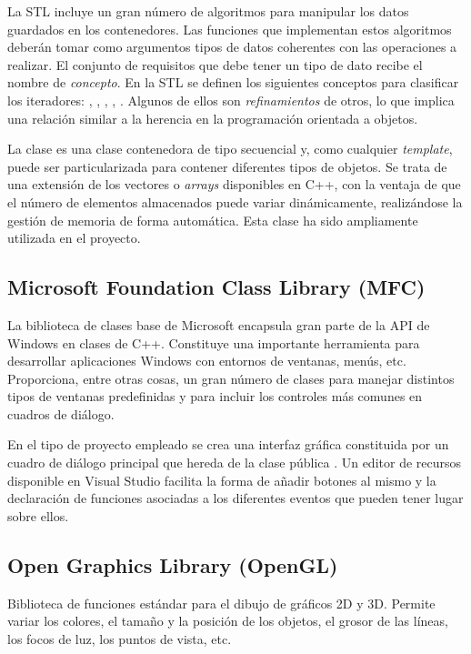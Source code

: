 La STL incluye un gran número de algoritmos para manipular los datos guardados en los contenedores. Las funciones que implementan estos algoritmos deberán tomar como argumentos tipos de datos coherentes con las operaciones a realizar. El conjunto de requisitos que debe tener un tipo de dato recibe el nombre de \emph{concepto}. En la STL se definen los siguientes conceptos para clasificar los iteradores: , , ,  , . Algunos de ellos son \emph{refinamientos} de otros, lo que implica una relación similar a la herencia en la programación orientada a objetos.

La clase  es una clase contenedora de tipo secuencial y, como cualquier \emph{template}, puede ser particularizada para contener diferentes tipos de objetos. Se trata de una extensión de los vectores o \emph{arrays} disponibles en C++, con la ventaja de que el número de elementos almacenados puede variar dinámicamente, realizándose la gestión de memoria de forma automática.
Esta clase ha sido ampliamente utilizada en el proyecto.

\subsection{Microsoft Foundation Class Library (MFC)} \label{mfc}

La biblioteca de clases base de Microsoft encapsula gran parte de la API de Windows en clases de C++. Constituye una importante herramienta para desarrollar aplicaciones Windows con entornos de ventanas, menús, etc. Proporciona, entre otras cosas, un gran número de clases para manejar distintos tipos de ventanas predefinidas y para incluir los controles más comunes en cuadros de diálogo.

En el tipo de proyecto empleado se crea una interfaz gráfica constituida por un cuadro de diálogo principal que hereda de la clase pública . Un editor de recursos disponible en Visual Studio facilita la forma de añadir botones al mismo y la declaración de funciones asociadas a los diferentes eventos que pueden tener lugar sobre ellos.

\subsection{Open Graphics Library (OpenGL)}

Biblioteca de funciones estándar para el dibujo de gráficos 2D y 3D. Permite variar los colores, el tamaño y la posición de los objetos, el grosor de las líneas, los focos de luz, los puntos de vista, etc.

